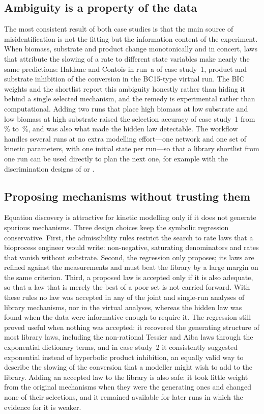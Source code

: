 \subsection{Ambiguity is a property of the data}
The most consistent result of both case studies is that the main source of misidentification is not the fitting but the information content of the experiment. When biomass, substrate and product change monotonically and in concert, laws that attribute the slowing of a rate to different state variables make nearly the same predictions: Haldane and Contois in run~a of case study~1, product and substrate inhibition of the conversion in the BC15-type virtual run. The BIC weights and the shortlist report this ambiguity honestly rather than hiding it behind a single selected mechanism, and the remedy is experimental rather than computational. Adding two runs that place high biomass at low substrate and low biomass at high substrate raised the selection accuracy of case study~1 from \ConeAccSingle\,\% to \ConeAccJoint\,\%, and was also what made the hidden law detectable. The workflow handles several runs at no extra modelling effort---one network and one set of kinetic parameters, with one initial state per run---so that a library shortlist from one run can be used directly to plan the next one, for example with the discrimination designs of \citet{BuzziFerraris1983} or \citet{Franceschini2008}.

\subsection{Proposing mechanisms without trusting them}
Equation discovery is attractive for kinetic modelling only if it does not generate spurious mechanisms. Three design choices keep the symbolic regression conservative. First, the admissibility rules restrict the search to rate laws that a bioprocess engineer would write: non-negative, saturating denominators and rates that vanish without substrate. Second, the regression only proposes; its laws are refined against the measurements and must beat the library by a large margin on the same criterion. Third, a proposed law is accepted only if it is also adequate, so that a law that is merely the best of a poor set is not carried forward. With these rules no law was accepted in any of the \ConeLibCasesJoint{} joint and \ConeLibCasesSingle{} single-run analyses of library mechanisms, nor in the \VirtSRn{} virtual analyses, whereas the hidden law was found when the data were informative enough to require it. The regression still proved useful when nothing was accepted: it recovered the generating structure of most library laws, including the non-rational Tessier and Aiba laws through the exponential dictionary terms, and in case study~2 it consistently suggested exponential instead of hyperbolic product inhibition, an equally valid way to describe the slowing of the conversion that a modeller might wish to add to the library. Adding an accepted law to the library is also safe: it took little weight from the original mechanisms when they were the generating ones and changed none of their selections, and it remained available for later runs in which the evidence for it is weaker.

